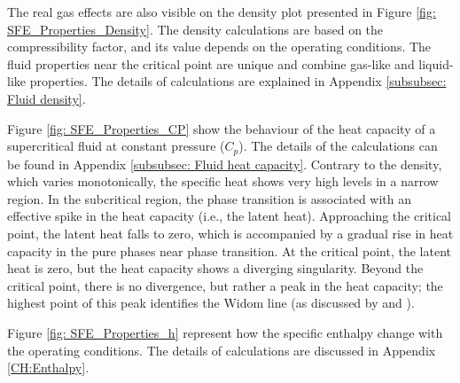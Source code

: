 \documentclass[../Article_Sensitivity_Analsysis.tex]{subfiles}
\begin{document}
	The real gas effects are also visible on the density plot presented in Figure \ref{fig: SFE_Properties_Density}. The density calculations are based on the compressibility factor, and its value depends on the operating conditions. The fluid properties near the critical point are unique and combine gas-like and liquid-like properties. The details of calculations are explained in Appendix \ref{subsubsec: Fluid density}.
	
	Figure \ref{fig: SFE_Properties_CP} show the behaviour of the heat capacity of a supercritical fluid at constant pressure ($C_p$). The details of the calculations can be found in Appendix \ref{subsubsec: Fluid heat capacity}. Contrary to the density, which varies monotonically, the specific heat shows very high levels in a narrow region. In the subcritical region, the phase transition is associated with an effective spike in the heat capacity (i.e., the latent heat). Approaching the critical point, the latent heat falls to zero, which is accompanied by a gradual rise in heat capacity in the pure phases near phase transition. At the critical point, the latent heat is zero, but the heat capacity shows a diverging singularity. Beyond the critical point, there is no divergence, but rather a peak in the heat capacity; the highest point of this peak identifies the Widom line (as discussed by \citet{Simeoni2010} and \citet{Banuti2019}).
	
	Figure \ref{fig: SFE_Properties_h} represent how the specific enthalpy change with the operating conditions. The details of calculations are discussed in Appendix \ref{CH:Enthalpy}.
		
\end{document}
